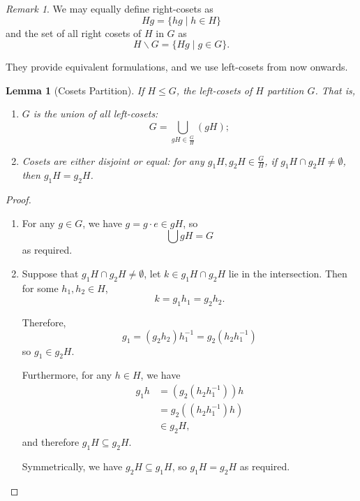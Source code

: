 \documentclass{article}
\newtheorem{lemma}[theorem]{Lemma}
\theoremstyle{definition}
\theoremstyle{remark}
\newtheorem{remark}[theorem]{Remark}
\newcommand{\pqty}[1]{\left(#1\right)}
\newcommand{\set}[2]{\{#1\mid #2\}}
\newcommand{\flatfrac}[2]{\frac{#1}{#2}}
\newcommand{\inverse}{^{-1}}
\newcommand{\subgroup}{\leq}
\begin{document}
\begin{remark}
    We may equally define right-cosets as
    \[
        Hg = \set{hg}{h \in H}
    \]
    and the set of all right cosets of \(H\) in \(G\) as
    \[
        H \backslash G = \set{Hg}{g \in G}.
    \]

    They provide equivalent formulations, and we use left-cosets from now onwards.
\end{remark}

\begin{lemma}[Cosets Partition]
    \label{lem:cosets-partition}%
    If \(H \subgroup G\), the left-cosets of \(H\) \emph{partition} \(G\). That is,
    \begin{enumerate}
        \item \(G\) is the union of all left-cosets:
        \[
            G = \bigcup_{gH \in \flatfrac{G}{H}} \pqty{gH};
        \]
        \item Cosets are either disjoint or equal: for any \(g_1 H, g_2 H \in \flatfrac{G}{H}\), if \(g_1 H \cap g_2 H \neq \emptyset\), then \(g_1 H = g_2 H\).
    \end{enumerate}
\end{lemma}

\begin{proof}
    \begin{enumerate}
        \item For any \(g \in G\), we have \(g = g \cdot e \in gH\), so
        \[
            \bigcup gH = G
        \]
        as required.

        \item Suppose that \(g_1 H \cap g_2 H \neq \emptyset\), let \(k \in g_1 H \cap g_2 H\) lie in the intersection. Then for some \(h_1, h_2 \in H\),
        \[
            k = g_1 h_1 = g_2 h_2.
        \]

        Therefore,
        \[
            g_1 = \pqty{g_2 h_2} h_1\inverse = g_2 \pqty{h_2 h_1\inverse}
        \]
        so \(g_1 \in g_2 H\).

        Furthermore, for any \(h \in H\), we have
        \begin{align*}
            g_1 h &= \pqty{g_2 \pqty{h_2 h_1\inverse}} h \\
            &= g_2 \pqty{\pqty{h_2 h_1\inverse} h} \\
            &\in g_2 H,
        \end{align*}
        and therefore \(g_1 H \subseteq g_2 H\).

        Symmetrically, we have \(g_2 H \subseteq g_1 H\), so \(g_1 H = g_2 H\) as required.
    \end{enumerate}
\end{proof}
\end{document}
